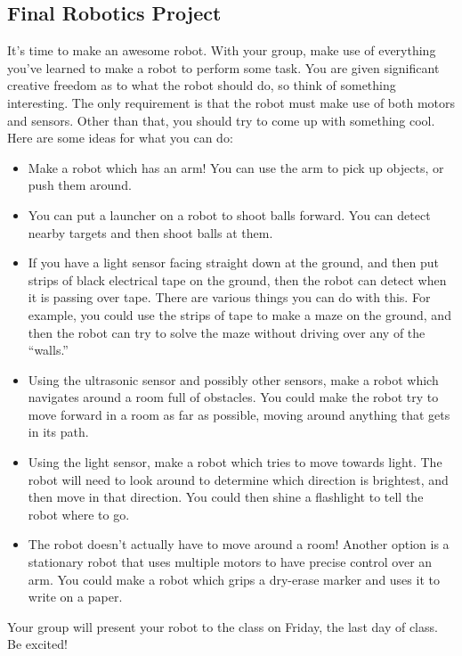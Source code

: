 \documentclass[11pt]{article}
\theoremstyle{plain}
\theoremstyle{definition}
\theoremstyle{remark}
\begin{document}
\begin{center}
\section*{Final Robotics Project}
\end{center}
It's time to make an awesome robot. With your group, make use of everything
you've learned to make a robot to perform some task. You are given significant
creative freedom as to what the robot should do, so think of something
interesting. The only requirement is that the robot must make use of both motors
and sensors. Other than that, you should try to come up with something cool.
Here are some ideas for what you can do:
\begin{itemize}
  \item Make a robot which has an arm! You can use the arm to pick up objects,
    or push them around.
  \item You can put a launcher on a robot to shoot balls forward. You can detect
    nearby targets and then shoot balls at them.
  \item If you have a light sensor facing straight down at the ground, and then
    put strips of black electrical tape on the ground, then the robot can detect
    when it is passing over tape. There are various things you can do with this.
    For example, you could use the strips of tape to make a maze on the ground,
    and then the robot can try to solve the maze without driving over any of the
    ``walls.''
  \item Using the ultrasonic sensor and possibly other sensors, make a robot
    which navigates around a room full of obstacles. You could make the
    robot try to move forward in a room as far as possible, moving around
    anything that gets in its path.
  \item Using the light sensor, make a robot which tries to move towards light.
    The robot will need to look around to determine which direction is
    brightest, and then move in that direction. You could then shine a
    flashlight to tell the robot where to go.
  \item The robot doesn't actually have to move around a room! Another option is
    a stationary robot that uses multiple motors to have precise control over an
    arm. You could make a robot which grips a dry-erase marker and uses it to
    write on a paper.
\end{itemize}
Your group will present your robot to the class on Friday, the last day of
class. Be excited!
\end{document}
